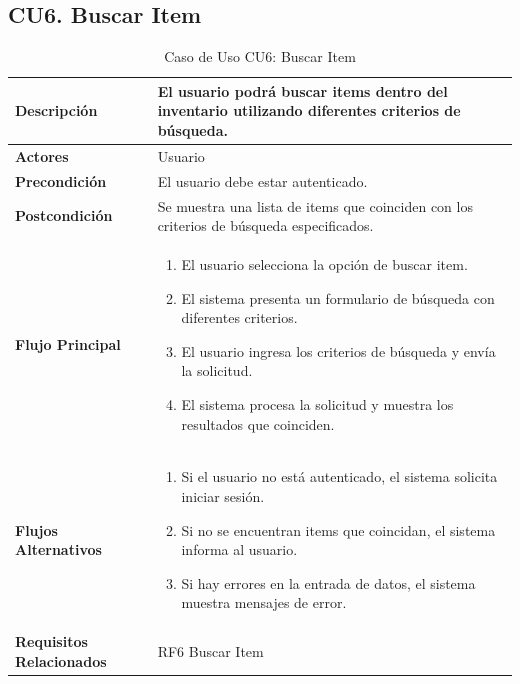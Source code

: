 \documentclass{article}
\begin{document}
\subsection{CU6. Buscar Item}
\begin{table}[H]
    \centering
    \begin{tabular}{|l|p{10cm}|}
        \hline
        \textbf{Descripción} & El usuario podrá buscar items dentro del inventario utilizando diferentes criterios de búsqueda. \\ \hline
        \textbf{Actores} & Usuario \\ \hline
        \textbf{Precondición} & El usuario debe estar autenticado. \\ \hline
        \textbf{Postcondición} & Se muestra una lista de items que coinciden con los criterios de búsqueda especificados. \\ \hline
        \textbf{Flujo Principal} & 
        \begin{enumerate}
            \item El usuario selecciona la opción de buscar item.
            \item El sistema presenta un formulario de búsqueda con diferentes criterios.
            \item El usuario ingresa los criterios de búsqueda y envía la solicitud.
            \item El sistema procesa la solicitud y muestra los resultados que coinciden.
        \end{enumerate} \\ \hline
        \textbf{Flujos Alternativos} & 
        \begin{enumerate}
            \item Si el usuario no está autenticado, el sistema solicita iniciar sesión.
            \item Si no se encuentran items que coincidan, el sistema informa al usuario.
            \item Si hay errores en la entrada de datos, el sistema muestra mensajes de error.
        \end{enumerate} \\ \hline
        \textbf{Requisitos Relacionados} & RF6 Buscar Item \\ \hline
    \end{tabular}
    \caption{Caso de Uso CU6: Buscar Item}
\end{table}

\newpage
\end{document}
